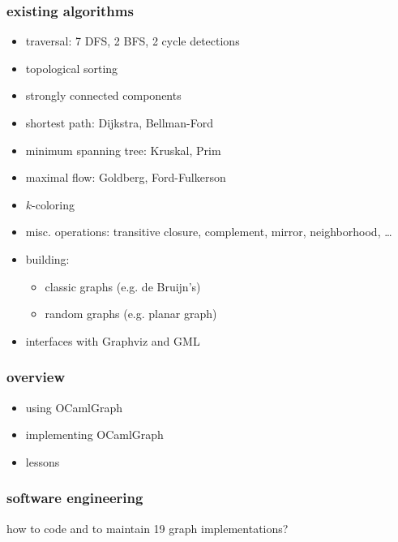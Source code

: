 \documentclass{beamer}
\begin{document}
\begin{frame}
  \frametitle{existing algorithms}
  \begin{itemize}
  \item traversal: 7 DFS, 2 BFS, 2 cycle detections
  \item topological sorting
  \item strongly connected components
  \item shortest path: Dijkstra, Bellman-Ford
  \item minimum spanning tree: Kruskal, Prim
  \item maximal flow: Goldberg, Ford-Fulkerson
  \item $k$-coloring
  \item misc. operations: transitive closure, complement, mirror,
    neighborhood, \dots
  \item building:
    \begin{itemize}
    \item classic graphs (e.g. de Bruijn's)
    \item random graphs (e.g. planar graph)
    \end{itemize}
  \item interfaces with Graphviz and GML
\end{itemize}
\end{frame}



\begin{frame}
  \frametitle{overview}
  \begin{itemize}
  \item \textcolor{black!30}{using OCamlGraph\vskip15pt}
  \item implementing OCamlGraph\vskip15pt
  \item \textcolor{black!30}{lessons\vskip15pt}
  \end{itemize}
\end{frame}

\begin{frame}
  \frametitle{software engineering}
  \begin{center}
    how to code and to maintain 19 graph implementations?
  \end{center}
\end{frame}
\end{document}

